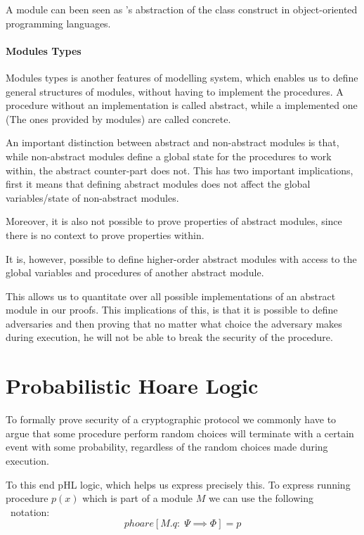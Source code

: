 A module can been seen as \easycrypt's abstraction of the class construct
in object-oriented programming languages.


\paragraph{Modules Types}
\label{sec:ec_module_types}
Modules types is another features of \easycrypt modelling system, which
enables us to define general structures of modules, without having to implement
the procedures. A procedure without an implementation is called abstract, while
a implemented one (The ones provided by modules) are called concrete.

An important distinction between abstract and non-abstract modules is that,
while non-abstract modules define a global state for the procedures to work
within, the abstract counter-part does not. This has two important implications,
first it means that defining abstract modules does not affect the global
variables/state of non-abstract modules.
\begin{draft}
Moreover, it is also not possible to prove properties of abstract modules, since
there is no context to prove properties within.
\end{draft}

It is, however, possible to define higher-order abstract modules with access to the global
variables and procedures of another abstract module.

This allows us to quantitate over all possible implementations of an abstract
module in our proofs. This implications of this, is that it is possible to
define adversaries and then proving that no matter what choice the adversary
makes during execution, he will not be able to break the security of the procedure.



\section{Probabilistic Hoare Logic}
\label{sec:pHL}
To formally prove security of a cryptographic protocol we commonly have to argue
that some procedure perform random choices will terminate with a certain event
with some probability, regardless of the random choices made during execution.

To this end pHL logic, which helps us express precisely this.
To express running procedure $p(x)$ which is part of a module $M$ we can use the
following \easycrypt\ notation:
\[
  phoare[M.q :\; \Psi \implies \Phi] = p
\]

